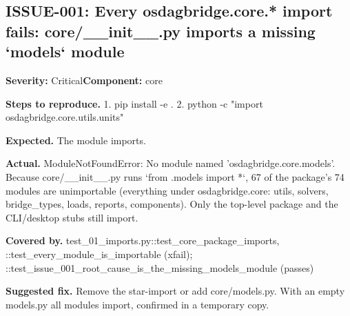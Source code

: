 \subsection*{ISSUE-001: Every osdagbridge.\allowbreak{}core.\allowbreak{}* import fails: core/\allowbreak{}\_\allowbreak{}\_\allowbreak{}init\_\allowbreak{}\_\allowbreak{}.\allowbreak{}py imports a missing `models` module}
\textbf{Severity:} Critical\quad \textbf{Component:} core\par
\textbf{Steps to reproduce.} 1.\allowbreak{} pip install -e .\allowbreak{} 2.\allowbreak{} python -c "import osdagbridge.\allowbreak{}core.\allowbreak{}utils.\allowbreak{}units"\par
\textbf{Expected.} The module imports.\allowbreak{}\par
\textbf{Actual.} ModuleNotFoundError: No module named 'osdagbridge.\allowbreak{}core.\allowbreak{}models'.\allowbreak{} Because core/\allowbreak{}\_\allowbreak{}\_\allowbreak{}init\_\allowbreak{}\_\allowbreak{}.\allowbreak{}py runs `from .\allowbreak{}models import *`, 67 of the package's 74 modules are unimportable (everything under osdagbridge.\allowbreak{}core: utils, solvers, bridge\_\allowbreak{}types, loads, reports, components).\allowbreak{} Only the top-level package and the CLI/\allowbreak{}desktop stubs still import.\allowbreak{}\par
\textbf{Covered by.} test\_\allowbreak{}01\_\allowbreak{}imports.\allowbreak{}py::\allowbreak{}test\_\allowbreak{}core\_\allowbreak{}package\_\allowbreak{}imports, ::\allowbreak{}test\_\allowbreak{}every\_\allowbreak{}module\_\allowbreak{}is\_\allowbreak{}importable (xfail); ::\allowbreak{}test\_\allowbreak{}issue\_\allowbreak{}001\_\allowbreak{}root\_\allowbreak{}cause\_\allowbreak{}is\_\allowbreak{}the\_\allowbreak{}missing\_\allowbreak{}models\_\allowbreak{}module (passes)\par
\textbf{Suggested fix.} Remove the star-import or add core/\allowbreak{}models.\allowbreak{}py.\allowbreak{} With an empty models.\allowbreak{}py all modules import, confirmed in a temporary copy.\allowbreak{}

